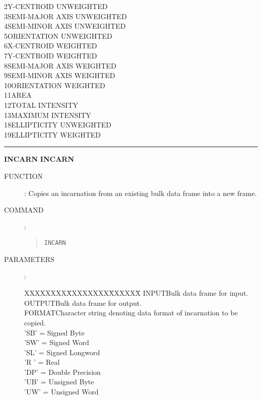 \begin{description}
\begin{tabbing}
2\>Y-CENTROID UNWEIGHTED\\
3\>SEMI-MAJOR AXIS UNWEIGHTED\\
4\>SEMI-MINOR AXIS UNWEIGHTED\\
5\>ORIENTATION UNWEIGHTED\\
6\>X-CENTROID WEIGHTED\\
7\>Y-CENTROID WEIGHTED\\
8\>SEMI-MAJOR AXIS WEIGHTED\\
9\>SEMI-MINOR AXIS WEIGHTED\\
10\>ORIENTATION WEIGHTED\\
11\>AREA\\
12\>TOTAL INTENSITY\\
13\>MAXIMUM INTENSITY\\
18\>ELLIPTICITY UNWEIGHTED\\
19\>ELLIPTICITY WEIGHTED
\end{tabbing}
\end{description}

\goodbreak
\rule{\textwidth}{0.3mm}
{\Large {\bf INCARN} \hfill {\bf INCARN}}
\begin{description}
\item [FUNCTION]:
Copies an incarnation from an existing bulk data frame into a new frame.
\item [COMMAND]:
\begin{quote}
{\tt INCARN}
\end{quote}
\item [PARAMETERS] :
\begin{tabbing}
XXXXXXXX\=XXXXXXXX\=XXXXXX\=\kill
INPUT\>\>Bulk data frame for input.\\
OUTPUT\>\>Bulk data frame for output.\\
FORMAT\>\>Character string denoting data format of incarnation to be copied.\\
\>\>\>'SB' = Signed Byte\\
\>\>\>'SW' = Signed Word\\
\>\>\>'SL' = Signed Longword\\
\>\>\>'R ' = Real\\
\>\>\>'DP' = Double Precision\\
\>\>\>'UB' = Unsigned Byte\\
\>\>\>'UW' = Unsigned Word
\end{tabbing}
\end{description}

